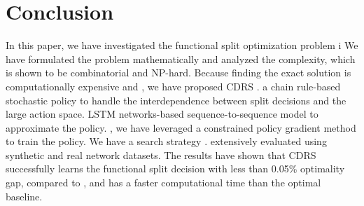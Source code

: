 \section{Conclusion} \label{sec:conclusion}
\vspace{-1mm}
In this paper, we have investigated the functional split optimization problem i We have formulated the problem mathematically and analyzed the complexity, which is shown to be combinatorial and NP-hard. 
%
Because finding the exact solution is computationally expensive and , we have proposed CDRS .
 a chain rule-based stochastic policy to handle the interdependence between split decisions and the large action space.  LSTM networks-based sequence-to-sequence model to approximate the policy. , we have leveraged a constrained policy gradient method to train the policy. We have  a search strategy . 
%
 extensively evaluated using synthetic and real network datasets. The results have shown that CDRS successfully learns the functional split decision with less than 0.05\% optimality gap,  compared to , and has a faster computational time than the optimal baseline. 
